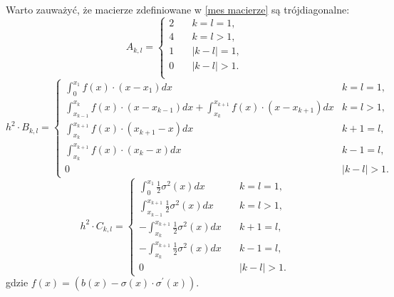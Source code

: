 \documentclass{article}
\begin{document}
Warto zauważyć, że macierze zdefiniowane w \eqref{mes macierze} są trójdiagonalne:
\begin{equation*}
A_{k,l} = \begin{cases}
2 \quad & k=l=1,\\
4 & k=l>1,\\
1 & |k-l|=1,\\
0 & |k-l| > 1.\\
\end{cases}
\end{equation*}
\begin{equation*}
h^{2}\cdot B_{k,l} = \begin{cases}
\int_{0}^{x_1} f(x)\cdot (x - x_1)dx &k = l =1, \\
\int_{x_{k-1}}^{x_{k}} f(x)\cdot (x-x_{k-1}) dx + \int_{x_k}^{x_{k+1}} f(x)\cdot (x - x_{k+1}) dx & k = l > 1, \\
\int_{x_k}^{x_{k+1}} f(x)\cdot (x_{k+1} - x) dx & k + 1 = l, \\
\int_{x_k}^{x_{k+1}} f(x)\cdot (x_k-x) dx & k - 1 = l, \\
0 &|k-l| > 1.
\end{cases}
\end{equation*}
\begin{equation*}
h^{2} \cdot C_{k,l} = \begin{cases}
\int_{0}^{x_1}\frac{1}{2}\sigma^{2}(x) dx  &k = l =1, \\
\int_{x_{k-1}}^{x_{k+1}} \frac{1}{2}\sigma^{2}(x) dx & k = l > 1, \\
-\int_{x_k}^{x_{k+1}} \frac{1}{2}\sigma^{2}(x) dx \quad & k + 1 = l, \\
-\int_{x_k}^{x_{k+1}} \frac{1}{2}\sigma^{2}(x) dx & k - 1 = l, \\
0 &|k-l| > 1.
\end{cases}
\end{equation*}
gdzie $f(x) = (b(x) - \sigma(x) \cdot \sigma^{'}(x))$.

\end{document}
